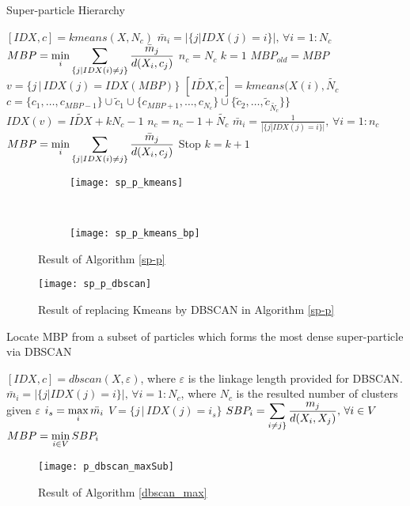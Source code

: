  \begin{algorithm}
\caption{Super-particle Hierarchy}
\label{sp-p}
\begin{algorithmic}[1]
\State $[IDX,c]=kmeans(X,N_c)$ 
\State $\bar m_i=|\{j | IDX(j)=i\}|,\,\forall i=1:N_c$
\State $MBP=\displaystyle\min_i \displaystyle\sum_{\{j|IDX(i)\neq j\}}\frac{\bar m_j}{d(X_i,c_j)}$ 
\State $n_c=N_c$
\State $k=1$
\State $MBP_{old} = MBP$
\State $v=\{j\,|\,IDX(j)=IDX(MBP)\}$
\State $[\tilde{IDX},\tilde{c}]=kmeans(X(i),\tilde{N_c}$
\State $c=\{c_1,\dots,c_{MBP-1}\}\cup\tilde{c}_1 \cup \{c_{MBP+1},\dots,c_{N_c}\}\cup \{\tilde{c}_2,\dots,\tilde{c}_{\tilde{N_c}}\}\}$
\State $IDX(v)=\tilde{IDX}+kN_c-1$
\State $n_c=n_c-1+\tilde{N_c}$
\State $\bar m_i=\frac{1}{|\{j | IDX(j)=i\}|},\,\forall i=1:n_c$
\State $MBP=\displaystyle\min_i \displaystyle\sum_{\{j|IDX(i)\neq j\}}\frac{\bar m_j}{d(X_i,c_j)}$ 
\State Stop
\EndIf
\State $k=k+1$
\EndWhile
\EndProcedure
\end{algorithmic} 
 \end{algorithm}
\begin{figure*}[t!]
\centering
\begin{subfigure}[t]{0.5\textwidth}
\centering
\texttt{[image: sp\_p\_kmeans]}
\end{subfigure}%
~ 
\begin{subfigure}[t]{0.5\textwidth}
\centering
\texttt{[image: sp\_p\_kmeans\_bp]}
\end{subfigure}
\caption{Result of Algorithm \ref{sp-p}}
\end{figure*}
\begin{figure}[h]
\centering
\texttt{[image: sp\_p\_dbscan]}%
\caption{Result of replacing Kmeans by DBSCAN in Algorithm \ref{sp-p}}
\label{fig:sp_dbscan}
\end{figure}

 \begin{algorithm}
\caption{Locate MBP from a subset of particles which forms the most dense super-particle via DBSCAN}
\label{dbscan_max}
\begin{algorithmic}[1]
\State $[IDX,c]=dbscan(X,\varepsilon)$, where $\varepsilon$ is the linkage length provided for DBSCAN. 
\State $\bar m_i=|\{j | IDX(j)=i\}|,\,\forall i=1:N_c$, where $N_c$ is the resulted number of clusters given $\varepsilon$
\State $i_s=\displaystyle\max_i \bar{m_i}$
\State $V=\{j \,|\, IDX(j)=i_s\}$
\State $SBP_i=\displaystyle\sum_{i\neq j\}}\frac{m_j}{d(X_i,X_j)},\, \forall i\in V$ 
\State $MBP=\displaystyle\min_{i\in V} SBP_i$
\EndProcedure
\end{algorithmic} 
 \end{algorithm}
\begin{figure}[H]
\centering
\texttt{[image: p\_dbscan\_maxSub]}%
\caption{Result of Algorithm \ref{dbscan_max}}
\label{fig:dbscan_max}
\end{figure}


